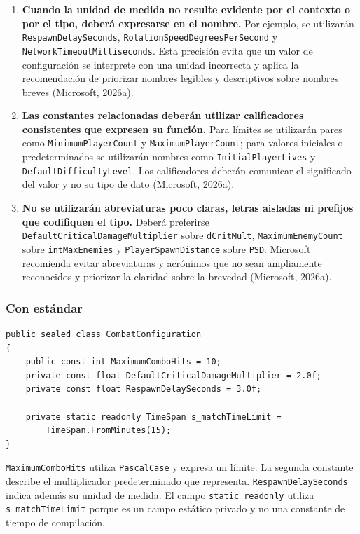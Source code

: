 \begin{enumerate}
  \item \textbf{Cuando la unidad de medida no resulte evidente por el contexto o por el tipo, deberá expresarse en el nombre.} Por ejemplo, se utilizarán \texttt{RespawnDelaySeconds}, \texttt{RotationSpeedDegreesPerSecond} y \texttt{NetworkTimeoutMilliseconds}. Esta precisión evita que un valor de configuración se interprete con una unidad incorrecta y aplica la recomendación de priorizar nombres legibles y descriptivos sobre nombres breves (Microsoft, 2026a).

  \item \textbf{Las constantes relacionadas deberán utilizar calificadores consistentes que expresen su función.} Para límites se utilizarán pares como \texttt{MinimumPlayerCount} y \texttt{MaximumPlayerCount}; para valores iniciales o predeterminados se utilizarán nombres como \texttt{InitialPlayerLives} y \texttt{DefaultDifficultyLevel}. Los calificadores deberán comunicar el significado del valor y no su tipo de dato (Microsoft, 2026a).

  \item \textbf{No se utilizarán abreviaturas poco claras, letras aisladas ni prefijos que codifiquen el tipo.} Deberá preferirse \texttt{DefaultCriticalDamageMultiplier} sobre \texttt{dCritMult}, \texttt{MaximumEnemyCount} sobre \texttt{intMaxEnemies} y \texttt{PlayerSpawnDistance} sobre \texttt{PSD}. Microsoft recomienda evitar abreviaturas y acrónimos que no sean ampliamente reconocidos y priorizar la claridad sobre la brevedad (Microsoft, 2026a).
\end{enumerate}

\subsubsection{Con estándar}

\begin{lstlisting}[style=csharpstyle]
public sealed class CombatConfiguration
{
    public const int MaximumComboHits = 10;
    private const float DefaultCriticalDamageMultiplier = 2.0f;
    private const float RespawnDelaySeconds = 3.0f;

    private static readonly TimeSpan s_matchTimeLimit =
        TimeSpan.FromMinutes(15);
}
\end{lstlisting}

\texttt{MaximumComboHits} utiliza \texttt{PascalCase} y expresa un límite. La segunda constante describe el multiplicador predeterminado que representa. \texttt{RespawnDelaySeconds} indica además su unidad de medida. El campo \texttt{static readonly} utiliza \texttt{s\_matchTimeLimit} porque es un campo estático privado y no una constante de tiempo de compilación.

